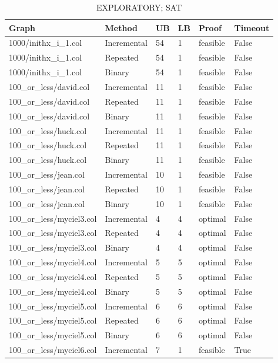 \begin{table}[htbp]
\centering
\caption{EXPLORATORY; SAT}
\label{tab:p2a-SAT-exploratory-results}
\begin{tabular}{llllll}
\hline
Graph & Method & UB & LB & Proof & Timeout \\
\hline
1000/inithx\_i\_1.col & Incremental & 54 & 1 & feasible & False \\
1000/inithx\_i\_1.col & Repeated & 54 & 1 & feasible & False \\
1000/inithx\_i\_1.col & Binary & 54 & 1 & feasible & False \\
100\_or\_less/david.col & Incremental & 11 & 1 & feasible & False \\
100\_or\_less/david.col & Repeated & 11 & 1 & feasible & False \\
100\_or\_less/david.col & Binary & 11 & 1 & feasible & False \\
100\_or\_less/huck.col & Incremental & 11 & 1 & feasible & False \\
100\_or\_less/huck.col & Repeated & 11 & 1 & feasible & False \\
100\_or\_less/huck.col & Binary & 11 & 1 & feasible & False \\
100\_or\_less/jean.col & Incremental & 10 & 1 & feasible & False \\
100\_or\_less/jean.col & Repeated & 10 & 1 & feasible & False \\
100\_or\_less/jean.col & Binary & 10 & 1 & feasible & False \\
100\_or\_less/myciel3.col & Incremental & 4 & 4 & optimal & False \\
100\_or\_less/myciel3.col & Repeated & 4 & 4 & optimal & False \\
100\_or\_less/myciel3.col & Binary & 4 & 4 & optimal & False \\
100\_or\_less/myciel4.col & Incremental & 5 & 5 & optimal & False \\
100\_or\_less/myciel4.col & Repeated & 5 & 5 & optimal & False \\
100\_or\_less/myciel4.col & Binary & 5 & 5 & optimal & False \\
100\_or\_less/myciel5.col & Incremental & 6 & 6 & optimal & False \\
100\_or\_less/myciel5.col & Repeated & 6 & 6 & optimal & False \\
100\_or\_less/myciel5.col & Binary & 6 & 6 & optimal & False \\
100\_or\_less/myciel6.col & Incremental & 7 & 1 & feasible & True \\

\end{tabular}
\end{table}
